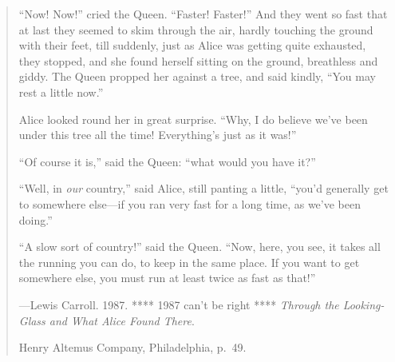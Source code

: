 

\cleardoublepage{}

\thispagestyle{empty} %

\vspace*{50 mm}

\small{}

\begin{quote}
	\protrudeleft``Now! Now!'' cried the Queen. 
	``Faster! Faster!'' 
	And they went so fast that at last they seemed to skim through the air, 
	hardly touching the ground with their feet, 
	till suddenly, 
	just as Alice was getting quite exhausted, 
	they stopped, 
	and she found herself sitting on the ground, 
	breathless and giddy. 
	The Queen propped her against a tree, and said kindly, 
	``You may rest a little now.''

	Alice looked round her in great surprise. 
	``Why, I do believe we've been under this tree all the time! 
	Everything's just as it was!''

	``Of course it is,'' said the Queen: ``what would you have it?'' %

	``Well, in \emph{our} country,'' said Alice, still panting a little, %
	``you'd generally get to somewhere else---if you ran very fast for a long time, 
	as we've been doing.''

	``A slow sort of country!'' said the Queen. 
	``Now, here, you see, it takes all the running you can do, to keep in the same place. 
	If you want to get somewhere else, you must run at least twice as fast as that!''

	\vspace{3 mm} %
	
		{%
		\setlength{\parskip}{0.0pt} %
		\hfill---Lewis Carroll. 1987. **** 1987 can't be right ****
				 \emph{Through the Looking-Glass and What Alice Found There}.
	
		\hfill Henry Altemus Company, Philadelphia, p.~49.}
\end{quote}

\normalsize{}



